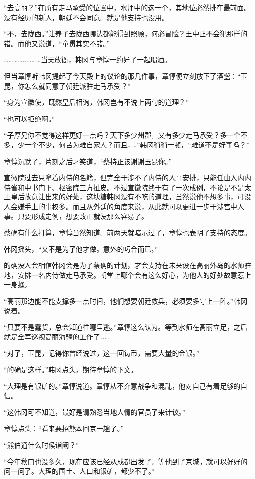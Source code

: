 “去高丽？”在所有走马承受的位置中，水师中的这一个，其地位必然排在最前面。没有经历的新人，朝廷不会同意。就是他支持也没用。

“不，去陇西。”让养子去陇西哪边都能得到照顾，何必冒险？王中正不会犯那样的错。而他又说道，“童贯其实不错。”

……………………当天放衙，韩冈与章惇一约好了一起喝酒。

但当章惇听韩冈提起了今天殿上的议论的那几件事，章惇便立刻放下了酒盏：“玉昆，你怎么就同意了朝廷派驻走马承受？”

“身为宣徽使，既然皇后相询，韩冈岂有不说上两句的道理？”

“也可以拒绝啊。”

“子厚兄你不觉得这样更好一点吗？天下多少州郡，又有多少走马承受？多一个不多，少一个不少，何苦为难自家人？而且……”韩冈稍稍一顿，“难道不是好事吗？”

章惇沉默了，片刻之后才笑道，“蔡持正该谢谢玉昆你。”

宣徽院过去只拿着内侍的名籍，但完全干涉不了内侍的人事安排，只能任由入内内侍省和中书门下、枢密院三方扯皮。不过宣徽院终于有了一次成例，不论是不是太上皇后故意让出来的好处，这块糖韩冈没有不吃的道理，虽然说他不想多事，可没人会嫌手上的事权多。而且从外廷的角度来说，从此就可以更进一步干涉宫中人事。只要形成定例，想要改正就没那么容易了。

蔡确有什么打算，章惇当然知道。前两天就暗示过了，章惇也表明了支持的态度。

韩冈摇头，“又不是为了他才做。意外的巧合而已。”

的确没人会相信韩冈会是为了蔡确的计划，才会支持在未来设在高丽外岛的水师驻地，安排一名内侍做走马承受。朝堂上哪个会有这么好心，为他人的好处故意惹上一身搔。

“高丽那边能不能支撑多一点时间，他们想要朝廷救兵，必须要多守上一阵。”韩冈说着。

“只要不是蠢货，总会知道往哪里逃。”章惇这么认为。等到水师在高丽立足，之后就是全军巡视高丽海疆的工作了……

“对了，玉昆，记得你曾经说过，这一回铸币，需要大量的金银。”

“的确是这样。”韩冈点头，期待章惇的下文。

“大理是有银矿的。”章惇说道。章惇从不介意战争和混乱，他对自己有着足够的自信。

“这韩冈可不知道，最好是请熟悉当地人情的官员了来计议。”

章惇点头：“看来要招熊本回京一趟了。”

“熊伯通什么时候诣阙？”

“今年秋曰也没多久，现在应该已经从成都出发了。等他到了京城，就可以好好的问一问了。大理的国土、人口和银矿，都少不了。”

